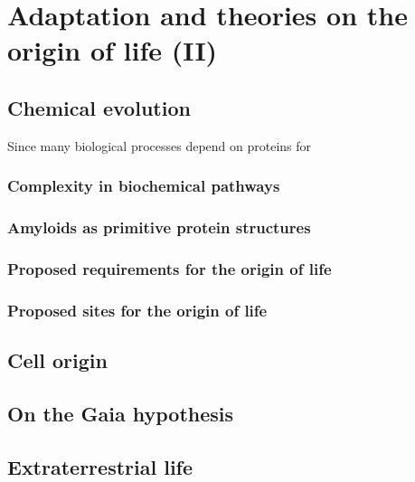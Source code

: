 \chapter{Adaptation and theories on the origin of life (II)}

\section{Chemical evolution}
Since many biological processes depend on proteins for 

\subsection{Complexity in biochemical pathways}

\subsection{Amyloids as primitive protein structures}

\subsection{Proposed requirements for the origin of life}

\subsection{Proposed sites for the origin of life}

\section{Cell origin}

\section{On the Gaia hypothesis}

\section{Extraterrestrial life}
